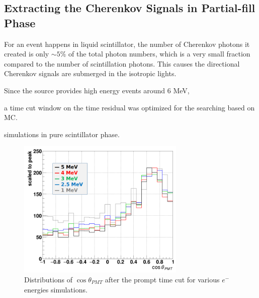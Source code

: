 \subsection{Extracting the Cherenkov Signals in Partial-fill Phase}

For an event happens in liquid scintillator, the number of Cherenkov photons it created is only $\sim 5\%$ 
of the total photon numbers, which is a very small fraction compared to the number of scintillation photons. This causes the directional Cherenkov signals are submerged in the isotropic lights.

Since the  source provides high energy events around 6 MeV, 






a time cut window on the time residual was optimized for the searching based on MC.

simulations in pure scintillator phase.






 
\begin{figure}[!htb]
	\centering
	\includegraphics[width=8cm]{cherenkov_scint_variousE.png}
	\caption{Distributions of $\cos\theta_{PMT}$ after the prompt time cut for various $e^-$ energies simulations.}
	\label{cherenkov_variousE}
\end{figure}


